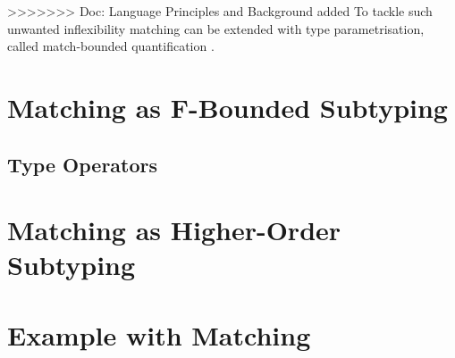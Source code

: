 >>>>>>> Doc: Language Principles and Background added
To tackle such unwanted inflexibility matching can be extended
with type parametrisation, called match-bounded quantification
\cite{abadi_subtyping_1996}. 
\section{Matching as F-Bounded Subtyping}
\subsection{Type Operators}


\section{Matching as Higher-Order Subtyping}

\section{Example with Matching}

